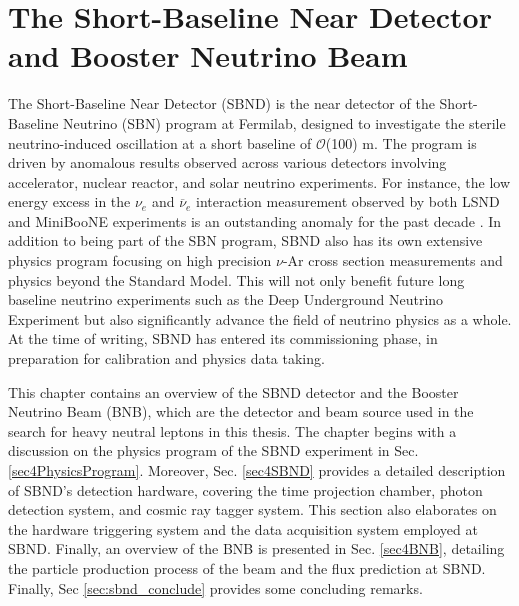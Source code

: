 \chapter{The Short-Baseline Near Detector and Booster Neutrino Beam}
\label{ChapterDetector}
\ifpdf
    \graphicspath{{Chapter4/Figs/Raster/}{Chapter4/Figs/PDF/}{Chapter4/Figs/}}
\else
    \graphicspath{{Chapter4/Figs/Vector/}{Chapter4/Figs/}}
\fi


The Short-Baseline Near Detector (SBND) is the near detector of the Short-Baseline Neutrino (SBN) program at Fermilab, designed to investigate the sterile neutrino-induced oscillation at a short baseline of $\mathcal{O}$(100) m. 
The program is driven by anomalous results observed across various detectors involving accelerator, nuclear reactor, and solar neutrino experiments.
For instance, the low energy excess in the $\nu_e$ and $\overline{\nu}_e$ interaction measurement observed by both LSND and MiniBooNE experiments is an outstanding anomaly for the past decade \cite{LSND_anomaly, Miniboone_anomaly}.
In addition to being part of the SBN program, SBND also has its own extensive physics program focusing on high precision $\nu$-Ar cross section measurements and physics beyond the Standard Model. 
This will not only benefit future long baseline neutrino experiments such as the Deep Underground Neutrino Experiment but also significantly advance the field of neutrino physics as a whole.
At the time of writing, SBND has entered its commissioning phase, in preparation for calibration and physics data taking.

This chapter contains an overview of the SBND detector and the Booster Neutrino Beam (BNB), which are the detector and beam source used in the search for heavy neutral leptons in this thesis.
The chapter begins with a discussion on the physics program of the SBND experiment in Sec. \ref{sec4PhysicsProgram}. 
Moreover, Sec. \ref{sec4SBND} provides a detailed description of SBND's detection hardware, covering the time projection chamber, photon detection system, and cosmic ray tagger system. 
This section also elaborates on the hardware triggering system and the data acquisition system employed at SBND.
Finally, an overview of the BNB is presented in Sec. \ref{sec4BNB}, detailing the particle production process of the beam and the flux prediction at SBND.
Finally, Sec \ref{sec:sbnd_conclude} provides some concluding remarks.  

